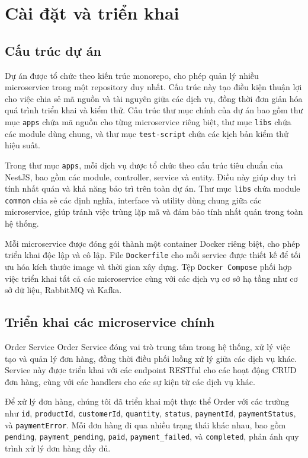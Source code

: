 \section{Cài đặt và triển khai}

\subsection{Cấu trúc dự án}
Dự án được tổ chức theo kiến trúc monorepo, cho phép quản lý nhiều microservice trong một repository duy nhất. Cấu trúc này tạo điều kiện thuận lợi cho việc chia sẻ mã nguồn và tài nguyên giữa các dịch vụ, đồng thời đơn giản hóa quá trình triển khai và kiểm thử. Cấu trúc thư mục chính của dự án bao gồm thư mục \texttt{apps} chứa mã nguồn cho từng microservice riêng biệt, thư mục \texttt{libs} chứa các module dùng chung, và thư mục \texttt{test-script} chứa các kịch bản kiểm thử hiệu suất.

Trong thư mục \texttt{apps}, mỗi dịch vụ được tổ chức theo cấu trúc tiêu chuẩn của NestJS, bao gồm các module, controller, service và entity. Điều này giúp duy trì tính nhất quán và khả năng bảo trì trên toàn dự án. Thư mục \texttt{libs} chứa module \texttt{common} chia sẻ các định nghĩa, interface và utility dùng chung giữa các microservice, giúp tránh việc trùng lặp mã và đảm bảo tính nhất quán trong toàn hệ thống.

Mỗi microservice được đóng gói thành một container Docker riêng biệt, cho phép triển khai độc lập và cô lập. File \texttt{Dockerfile} cho mỗi service được thiết kế để tối ưu hóa kích thước image và thời gian xây dựng. Tệp \texttt{Docker Compose} phối hợp việc triển khai tất cả các microservice cùng với các dịch vụ cơ sở hạ tầng như cơ sở dữ liệu, RabbitMQ và Kafka.

\subsection{Triển khai các microservice chính}

Order Service
Order Service đóng vai trò trung tâm trong hệ thống, xử lý việc tạo và quản lý đơn hàng, đồng thời điều phối luồng xử lý giữa các dịch vụ khác. Service này được triển khai với các endpoint RESTful cho các hoạt động CRUD đơn hàng, cùng với các handlers cho các sự kiện từ các dịch vụ khác.

Để xử lý đơn hàng, chúng tôi đã triển khai một thực thể Order với các trường như \texttt{id}, \texttt{productId}, \texttt{customerId}, \texttt{quantity}, \texttt{status}, \texttt{paymentId}, \texttt{paymentStatus}, và \texttt{paymentError}. Mỗi đơn hàng đi qua nhiều trạng thái khác nhau, bao gồm \texttt{pending}, \texttt{payment\_pending}, \texttt{paid}, \texttt{payment\_failed}, và \texttt{completed}, phản ánh quy trình xử lý đơn hàng đầy đủ.

